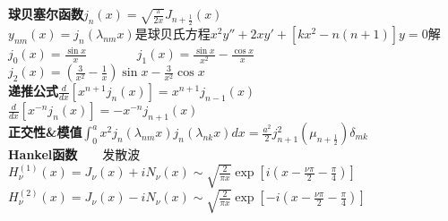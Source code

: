 \documentclass[10pt,a4paper]{article}
\begin{document}
\begin{multicols}{2}
\textbf{球贝塞尔函数}$j_n(x)=\sqrt{\frac{\pi}{2x}}J_{n+\frac{1}{2}}(x)$\\
\indent$y_{nm}(x)=j_n(\lambda_{nm}x)$是球贝氏方程\scriptsize$x^2y''+2xy'+[kx^2-n(n+1)]y=0$解\\
\indent$j_0(x)=\frac{\sin x}{x}$~~~~~~~~$j_1(x)=\frac{\sin x}{x^2}-\frac{\cos x}{x}$~~~~~~~~$j_2(x)=(\frac{3}{x^2}-\frac{1}{x})\sin x-\frac{3}{x^2}\cos x$\\
\textbf{递推公式}$\frac{d}{dx}[x^{n+1}j_n(x)]=x^{n+1}j_{n-1}(x)$~~~~~~~~$\frac{d}{dx}[x^{-n}j_n(x)]=-x^{-n}j_{n+1}(x)$\\
\textbf{正交性\&模值}$\int_0^ax^2j_n(\lambda_{nm}x)j_n(\lambda_{nk}x)dx=\frac{a^2}{2}j_{n+1}^2(\mu_{n+\frac{1}{2}})\delta_{mk}$\\
\textbf{Hankel函数}~~~~发散波$H_{\nu}^{(1)}(x)=J_{\nu}(x)+iN_{\nu}(x)\sim\sqrt{\frac{2}{\pi x}}\exp[i(x-\frac{\nu\pi}{2}-\frac{\pi}{4})]$\\
$H_{\nu}^{(2)}(x)=J_{\nu}(x)-iN_{\nu}(x)\sim\sqrt{\frac{2}{\pi x}}\exp[-i(x-\frac{\nu\pi}{2}-\frac{\pi}{4})]$\\

\end{multicols}
\end{document}

